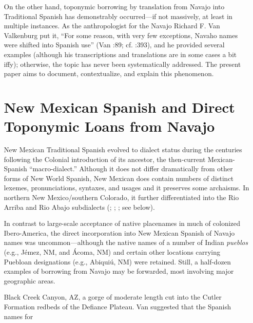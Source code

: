 On the other hand, toponymic borrowing by translation from Navajo into Traditional Spanish has demonstrably occurred—if not massively, at least in multiple instances.  As the anthropologist for the Navajo Richard F. Van Valkenburg put it, “For some reason, with very few exceptions, Navaho names were shifted into Spanish use” (Van \citealt{ValkenburgWalker1945}:89; cf. \citealt{Reichard1990}:393), and he provided several examples (although his transcriptions and translations are in some cases a bit iffy); otherwise, the topic has never been systematically addressed.  The present paper aims to document, contextualize, and explain this phenomenon.  

\section{\textbf{New} \textbf{Mexican} \textbf{Spanish} \textbf{and} \textbf{Direct} \textbf{Toponymic} \textbf{Loans} \textbf{from} \textbf{Navajo}}

New Mexican Traditional Spanish evolved to dialect status during the centuries following the Colonial introduction of its ancestor, the then-current Mexican-Spanish “macro-dialect.”  Although it does not differ dramatically from other forms of New World Spanish, New Mexican does contain numbers of distinct lexemes, pronunciations, syntaxes, and usages and it preserves some archaisms.  In northern New Mexico/southern Colorado, it further differentiated into the Rio Arriba and Rio Abajo subdialects (\citealt{Cobos1983}; \citealt{Julyan1998}; \citealt{BillsVigil2008}; see below).

In contrast to large-scale acceptance of native placenames in much of colonized Ibero-America, the direct incorporation into New Mexican Spanish of Navajo names was uncommon—although the native names of a number of Indian \textit{pueblos} (e.g., Jémez, NM, and Ácoma, NM) and certain other locations carrying Puebloan designations (e.g., Abiquiú, NM) were retained.  Still, a half-dozen examples of borrowing from Navajo may be forwarded, most involving major geographic areas.  

Black Creek Canyon, AZ, a gorge of moderate length cut into the Cutler Formation redbeds of the Defiance Plateau.  Van \citet[90]{Valkenburgh1945} suggested that the Spanish names for

